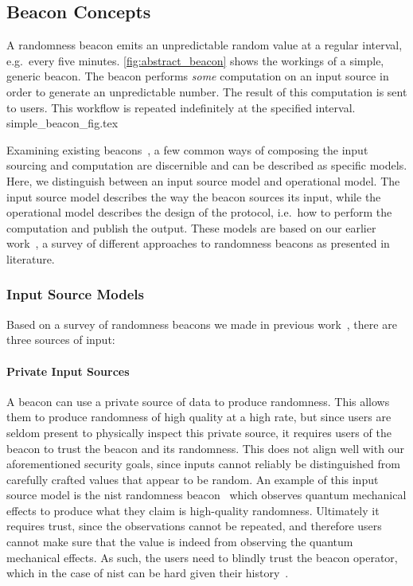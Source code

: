 \subsection{Beacon Concepts}

A randomness beacon emits an unpredictable random value at a regular interval, e.g.\ every five minutes.
\cref{fig:abstract_beacon} shows the workings of a simple, generic beacon.
The beacon performs \emph{some} computation on an input source in order to generate an unpredictable number.
The result of this computation is sent to users.
This workflow is repeated indefinitely at the specified interval.
{simple_beacon_fig.tex}

Examining existing beacons~\cite{nistbeacon,randomzoo,bentov2016bitcoin,fischer2011publicrandomnessservice,bonneau2015bitcoin,baigneres2015trap,clark2010use,randao,bunz2017proofsof,syta2017scalable,cascudo2017scrape}, a few common ways of composing the input sourcing and computation are discernible and can be described as specific models.
Here, we distinguish between an input source model and operational model.
The input source model describes the way the beacon sources its input, while the operational model describes the design of the protocol, i.e.\ how to perform the computation and publish the output.
These models are based on our earlier work~\cite{worldsbestpaper}, a survey of different approaches to randomness beacons as presented in literature.

\subsubsection{Input Source Models}
Based on a survey of randomness beacons we made in previous work~\cite{worldsbestpaper}, there are three sources of input:

\paragraph{Private Input Sources}
A beacon can use a private source of data to produce randomness.
This allows them to produce randomness of high quality at a high rate, but since users are seldom present to physically inspect this private source, it requires users of the beacon to trust the beacon and its randomness.
This does not align well with our aforementioned security goals, since inputs cannot reliably be distinguished from carefully crafted values that appear to be random.
An example of this input source model is the \gls{nist} randomness beacon~\cite{nistbeacon} which observes quantum mechanical effects to produce what they claim is high-quality randomness.
Ultimately it requires trust, since the observations cannot be repeated, and therefore users cannot make sure that the value is indeed from observing the quantum mechanical effects.
As such, the users need to blindly trust the beacon operator, which in the case of \gls{nist} can be hard given their history~\cite{nist2014backdoor, nytimes-nsaconstants, nytimes-nsabackdoors}.

